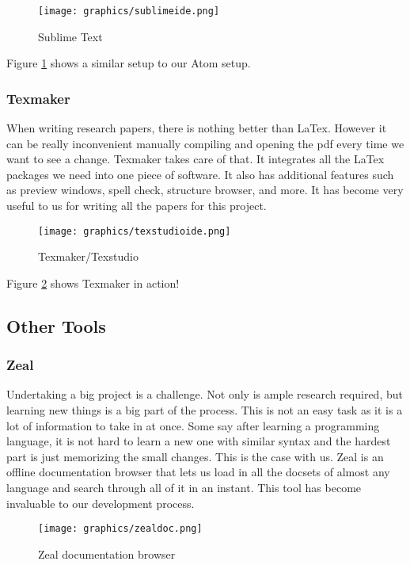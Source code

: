 \documentclass[letterpaper, 11pt]{article}
\begin{document}
\begin{figure}
    \centering
	\texttt{[image: graphics/sublimeide.png]}
    \caption{Sublime Text} \label{sublime}
\end{figure}

Figure \ref{sublime} shows a similar setup to our Atom setup.

\newpage

\subsubsection{Texmaker}
When writing research papers, there is nothing better than LaTex. However it can be really
inconvenient manually compiling and opening the pdf every time we want to see a change.
Texmaker takes care of that. It integrates all the LaTex packages we need into one piece
of software. It also has additional features such as preview windows, spell check,
structure browser, and more. It has become very useful to us for writing all the
papers for this project.

\begin{figure}
    \centering
	\texttt{[image: graphics/texstudioide.png]}
    \caption{Texmaker/Texstudio} \label{texmaker}
\end{figure}

Figure \ref{texmaker} shows Texmaker in action!

\newpage

\subsection{Other Tools}

\subsubsection{Zeal}
Undertaking a big project is a challenge. Not only is ample research required, but learning
new things is a big part of the process. This is not an easy task as it is a lot of information
to take in at once. Some say after learning a programming language, it is not hard to learn a
new one with similar syntax and the hardest part is just memorizing the small changes. This
is the case with us. Zeal is an offline documentation browser that lets us load in all
the docsets of almost any language and search through all of it in an instant. This tool
has become invaluable to our development process.

\begin{figure}
    \centering
	\texttt{[image: graphics/zealdoc.png]}
    \caption{Zeal documentation browser} \label{zeal}
\end{figure}
\end{document}
